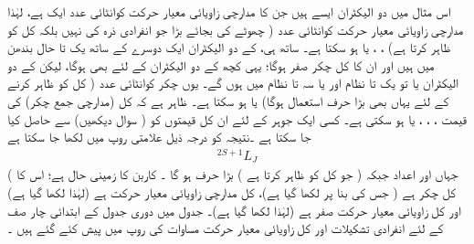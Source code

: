  اس مثال میں  دو الیکٹران ایسے  ہیں جن کا  مدارچی زاویائی معیار حرکت کوانٹائی   عدد ایک   ہے،  لہٰذا  مدارچی زاویائی معیار حرکت کوانٹائی عدد    ( چھوٹے  کی بجائے بڑا    جو انفرادی ذرہ کی نہیں بلکہ کل کو ظاہر کرتا ہے)   ، ، یا   ہو  سکتا ہے۔ ساتھ ہی،      کے دو   الیکٹران ایک دوسرے کے ساتھ یک تا حال  بندھن میں  ہیں اور ان کا کل چکر صفر ہوگا؛  یہی کچھ   کے دو الیکٹران کے لئے بھی ہوگا،  لیکن    کے دو الیکٹران یا تو یک تا نظام اور یا سہ تا نظام میں ہوں گے۔ یوں چکر کوانٹائی  عدد (  کل کو ظاہر کرنے کے لئے یہاں بھی  بڑا حرف استعمال ہوگا)    یا   ہو سکتا ہے۔ ظاہر ہے کہ  کل (مدارچی جمع چکر)  کی قیمت ، ، ، یا  ہو سکتی ہے۔ کسی ایک جوہر کے لئے ان کل قیمتوں کو  ( سوال    دیکھیں)  سے حاصل کیا جا سکتا ہے ۔نتیجہ کو درجہ ذیل علامتی  روپ میں لکھا جا سکتا ہے
 \begin{align}\label{مساوات_متماثل_علامتی_لکھائی}
 ^{2S+1}L_{J}
 \end{align}
(  جہاں   اور  اعداد جبکہ     ( جو  کل کو ظاہر کرتا ہے ) بڑا حرف    ہو گا ۔ کاربن کا زمینی حال     ہے؛  اس کا کل چکر  ہے ( جس کی بنا پر   لکھا گیا ہے)،  کل مدارچی زاویائی معیار حرکت   ہے  (لہٰذا        لکھا گیا ہے)  اور   کل زاویائی معیار حرکت صفر ہے  (لہٰذا   لکھا گیا ہے)۔ جدول    میں دوری جدول کے ابتدائی چار  صف  کے لئے انفرادی  تشکیلات  اور کل زاویائی معیار حرکت مساوات   کی روپ میں پیش کئے گئے ہیں ۔ 

